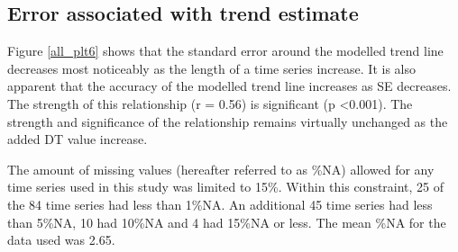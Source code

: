 \documentclass{ametsoc}
\begin{document}
\subsection{Error associated with trend estimate}
Figure \ref{all_plt6} shows that the standard error around the modelled trend line decreases most noticeably as the length of a time series increase. It is also apparent that the accuracy of the modelled trend line increases as SE decreases. The strength of this relationship (r = 0.56) is significant (p <0.001). The strength and significance of the relationship remains virtually unchanged as the added DT value increase.


The amount of missing values (hereafter referred to as \%NA) allowed for any time series used in this study was limited to 15\%. Within this constraint, 25 of the 84 time series had less than 1\%NA. An additional 45 time series had less than 5\%NA, 10 had 10\%NA and 4 had 15\%NA or less. The mean \%NA for the data used was 2.65.
\end{document}
